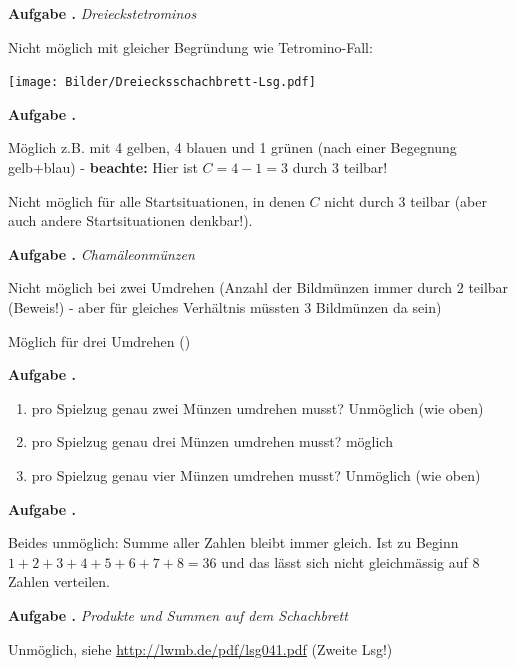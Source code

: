\documentclass[a4paper,ngerman,12pt]{scrartcl}
\theoremstyle{definition}
\theoremstyle{plain}
\theoremstyle{remark}
\newlength{\aufgabenskip}
\newcounter{aufgabennummer}
\newenvironment{aufgabe}[1]{
	\addtocounter{aufgabennummer}{1}
	\textbf{Aufgabe \theaufgabennummer.} \emph{#1} \par
}{\vspace{\aufgabenskip}}
\begin{document}
\begin{aufgabe}{Dreieckstetrominos}
	Nicht möglich mit gleicher Begründung wie Tetromino-Fall:
	\begin{center}
		\texttt{[image: Bilder/Dreiecksschachbrett-Lsg.pdf]}
	\end{center}
\end{aufgabe}

\begin{aufgabe}{}
	Möglich z.B. mit 4 gelben, 4 blauen und 1 grünen (nach einer Begegnung gelb+blau) - \textbf{beachte:} Hier ist $C = 4 - 1 = 3$ durch 3 teilbar!
	
	Nicht möglich für alle Startsituationen, in denen $C$ nicht durch $3$ teilbar (aber auch andere Startsituationen denkbar!).
\end{aufgabe}

\begin{aufgabe}{Chamäleonmünzen}
	Nicht möglich bei zwei Umdrehen (Anzahl der Bildmünzen immer durch $2$ teilbar (Beweis!) - aber für gleiches Verhältnis müssten 3 Bildmünzen da sein)
	
	Möglich für drei Umdrehen ()
\end{aufgabe}

\begin{aufgabe}{}
	\begin{enumerate}
		\item pro Spielzug genau zwei Münzen umdrehen musst? Unmöglich (wie oben)
		\item pro Spielzug genau drei Münzen umdrehen musst? möglich
		\item pro Spielzug genau vier Münzen umdrehen musst? Unmöglich (wie oben)
	\end{enumerate}
\end{aufgabe}

\begin{aufgabe}{}
Beides unmöglich: Summe aller Zahlen bleibt immer gleich. Ist zu Beginn $1+2+3+4+5+6+7+8=36$ und das lässt sich nicht gleichmässig auf $8$ Zahlen verteilen.
\end{aufgabe}

\begin{aufgabe}{Produkte und Summen auf dem Schachbrett}
	Unmöglich, siehe \url{http://lwmb.de/pdf/lsg041.pdf} (Zweite Lsg!)
\end{aufgabe}
\end{document}
